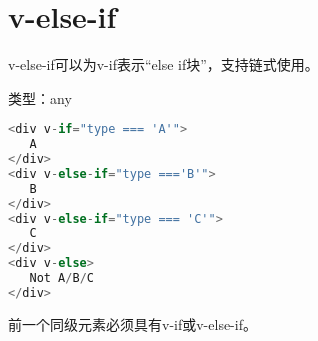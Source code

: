 \begin{lstlisting}[language=JavaScript]

\end{lstlisting}




\begin{lstlisting}[language=JavaScript]

\end{lstlisting}


\chapter{v-else-if}


v-else-if可以为v-if表示“else if块”，支持链式使用。


\begin{compactitem}
\item 类型：any
\end{compactitem}





\begin{lstlisting}[language=JavaScript]
<div v-if="type === 'A'">
   A
</div>
<div v-else-if="type ==='B'">
   B
</div>
<div v-else-if="type === 'C'">
   C
</div>
<div v-else>
   Not A/B/C
</div>
\end{lstlisting}

\begin{compactitem}
\item 前一个同级元素必须具有v-if或v-else-if。
\end{compactitem}

\begin{lstlisting}[language=JavaScript]

\end{lstlisting}




\begin{lstlisting}[language=JavaScript]

\end{lstlisting}




\begin{lstlisting}[language=JavaScript]

\end{lstlisting}




\begin{lstlisting}[language=JavaScript]

\end{lstlisting}




